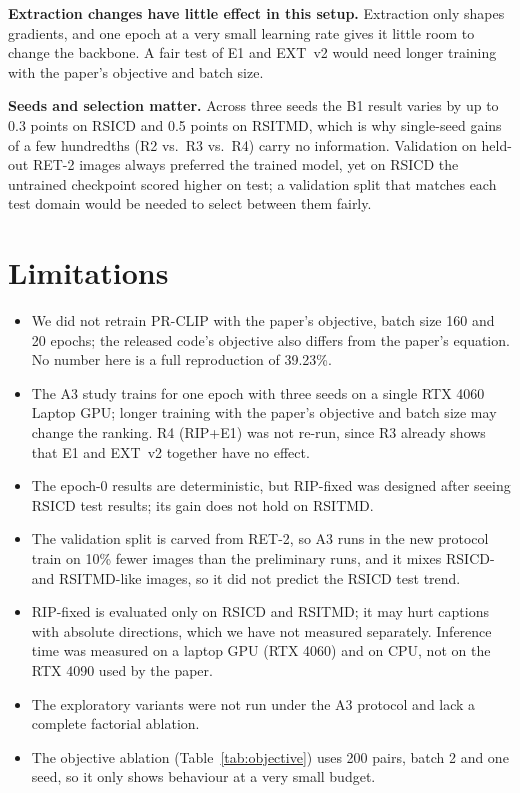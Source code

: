 \documentclass[conference]{IEEEtran}
\begin{document}
\textbf{Extraction changes have little effect in this setup.} Extraction only shapes gradients, and one epoch at a very small learning rate gives it little room to change the backbone. A fair test of E1 and EXT~v2 would need longer training with the paper's objective and batch size.

\textbf{Seeds and selection matter.} Across three seeds the B1 result varies by up to 0.3 points on RSICD and 0.5 points on RSITMD, which is why single-seed gains of a few hundredths (R2 vs.\ R3 vs.\ R4) carry no information. Validation on held-out RET-2 images always preferred the trained model, yet on RSICD the untrained checkpoint scored higher on test; a validation split that matches each test domain would be needed to select between them fairly.

\section{Limitations}
\begin{itemize}
\item We did not retrain PR-CLIP with the paper's objective, batch size 160 and 20 epochs; the released code's objective also differs from the paper's equation. No number here is a full reproduction of 39.23\%.
\item The A3 study trains for one epoch with three seeds on a single RTX 4060 Laptop GPU; longer training with the paper's objective and batch size may change the ranking. R4 (RIP+E1) was not re-run, since R3 already shows that E1 and EXT~v2 together have no effect.
\item The epoch-0 results are deterministic, but RIP-fixed was designed after seeing RSICD test results; its gain does not hold on RSITMD.
\item The validation split is carved from RET-2, so A3 runs in the new protocol train on 10\% fewer images than the preliminary runs, and it mixes RSICD- and RSITMD-like images, so it did not predict the RSICD test trend.
\item RIP-fixed is evaluated only on RSICD and RSITMD; it may hurt captions with absolute directions, which we have not measured separately. Inference time was measured on a laptop GPU (RTX 4060) and on CPU, not on the RTX 4090 used by the paper.
\item The exploratory variants were not run under the A3 protocol and lack a complete factorial ablation.
\item The objective ablation (Table~\ref{tab:objective}) uses 200 pairs, batch 2 and one seed, so it only shows behaviour at a very small budget.
\end{itemize}
\end{document}
